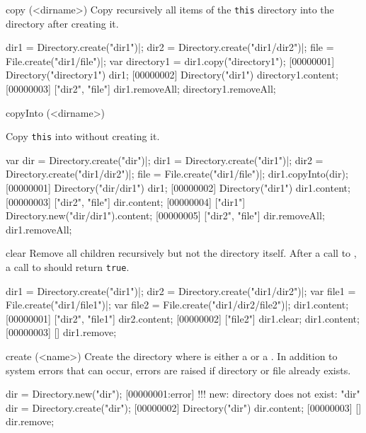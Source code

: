 \begin{urbiscriptapi}
\item[copy](<dirname>)
  Copy recursively all items of the \lstinline|this| directory
  into the directory  after creating it.
\begin{urbiscript}
dir1 = Directory.create("dir1")|;
dir2 = Directory.create("dir1/dir2")|;
file = File.create("dir1/file")|;
var directory1 = dir1.copy("directory1");
[00000001] Directory("directory1")
dir1;
[00000002] Directory("dir1")
directory1.content;
[00000003] ["dir2", "file"]
dir1.removeAll;
directory1.removeAll;
\end{urbiscript}

\item[copyInto](<dirname>)
  \experimental{}

  Copy \lstinline|this| into  without creating it.
\begin{urbiscript}
var dir = Directory.create("dir")|;
dir1 = Directory.create("dir1")|;
dir2 = Directory.create("dir1/dir2")|;
file = File.create("dir1/file")|;
dir1.copyInto(dir);
[00000001] Directory("dir/dir1")
dir1;
[00000002] Directory("dir1")
dir1.content;
[00000003] ["dir2", "file"]
dir.content;
[00000004] ["dir1"]
Directory.new("dir/dir1").content;
[00000005] ["dir2", "file"]
dir.removeAll;
dir1.removeAll;
\end{urbiscript}

\item[clear]
  Remove all children recursively but not the directory itself. After a
  call to , a call to  should return
  \lstinline|true|.
\begin{urbiscript}
dir1 = Directory.create("dir1")|;
dir2 = Directory.create("dir1/dir2")|;
var file1 = File.create("dir1/file1")|;
var file2 = File.create("dir1/dir2/file2")|;
dir1.content;
[00000001] ["dir2", "file1"]
dir2.content;
[00000002] ["file2"]
dir1.clear;
dir1.content;
[00000003] []
dir1.remove;
\end{urbiscript}

\item[create](<name>)
  Create the directory  where  is either a
   or a . In addition to system errors that
  can occur, errors are raised if directory or file  already exists.
\begin{urbiscript}
dir = Directory.new("dir");
[00000001:error] !!! new: directory does not exist: "dir"
dir = Directory.create("dir");
[00000002] Directory("dir")
dir.content;
[00000003] []
dir.remove;
\end{urbiscript}


\end{urbiscriptapi}
